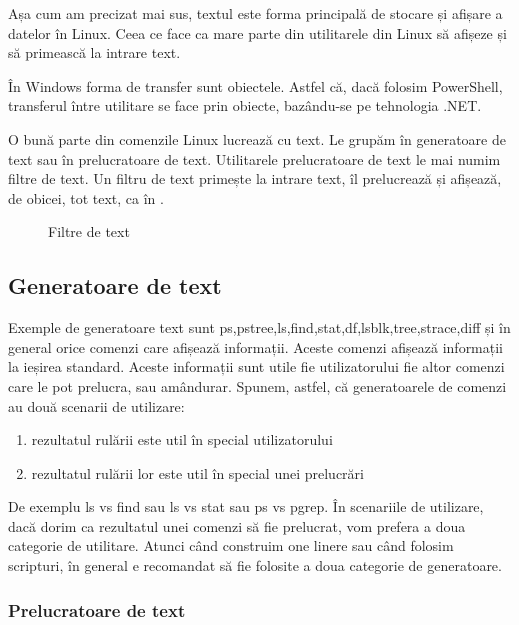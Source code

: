 Așa cum am precizat mai sus, textul este forma principală de stocare și afișare
a datelor în Linux. Ceea ce face ca mare parte din utilitarele din Linux să
afișeze și să primească la intrare text.

În Windows forma de transfer sunt obiectele. Astfel că, dacă folosim PowerShell,
transferul între utilitare se face prin obiecte, bazându-se pe tehnologia .NET.

O bună parte din comenzile Linux lucrează cu text. Le grupăm în generatoare de
text sau în prelucratoare de text. Utilitarele prelucratoare de text le mai
numim filtre de text. Un filtru de text primește la intrare text, îl prelucrează
și afișează, de obicei, tot text, ca în .

\begin{figure}[htbp]
  \centering
  \def\svgwidth{\columnwidth}
  
  \caption{Filtre de text}
  \label{fig:cli:text-filters}
\end{figure}

\subsection{Generatoare de text}
\label{sec:cli-text-gen}

Exemple de generatoare text sunt ps,pstree,ls,find,stat,df,lsblk,tree,strace,diff și în general orice comenzi care afișează informații. Aceste comenzi afișează informații la ieșirea standard. Aceste informații sunt utile fie utilizatorului fie altor comenzi care le pot prelucra, sau amândurar. Spunem, astfel, că generatoarele de comenzi au două scenarii de utilizare:

\begin{enumerate}
  \item rezultatul rulării este util în special utilizatorului
  \item rezultatul rulării lor este util în special unei prelucrări
\end{enumerate}

De exemplu ls vs find sau ls vs stat sau ps vs pgrep. În scenariile de
utilizare, dacă dorim ca rezultatul unei comenzi să fie prelucrat, vom prefera a
doua categorie de utilitare. Atunci când construim one linere sau când folosim
scripturi, în general e recomandat să fie folosite a doua categorie de
generatoare.

\subsubsection{Prelucratoare de text}
\label{sec:cli-text-proc}

